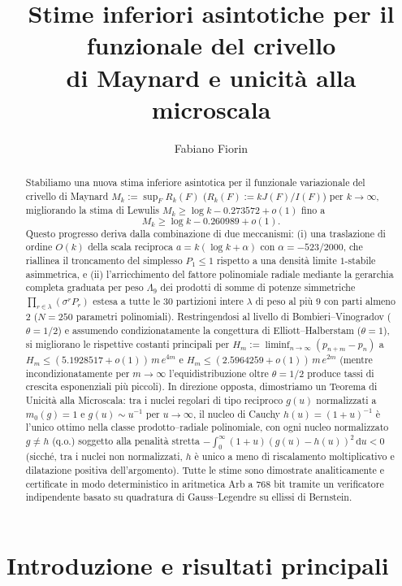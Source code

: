 \documentclass[11pt, reqno]{amsart}
\title[Stime asintotiche sul funzionale di Maynard]{%
Stime inferiori asintotiche per il funzionale del crivello\\
di Maynard e unicità alla microscala}
\author{Fabiano Fiorin}
\theoremstyle{remark}
\numberwithin{equation}{section}
\newcommand{\dd}{\,\mathrm{d}}
\begin{document}
\begin{abstract}
Stabiliamo una nuova stima inferiore asintotica per il funzionale variazionale del crivello
di Maynard $M_k := \sup_F R_k(F)$ ($R_k(F) := k J(F)/I(F)$) per $k \to \infty$, migliorando
la stima di Lewulis $M_k \ge \log k - 0.273572 + o(1)$ fino a
\[
M_k \ge \log k - 0.260989 + o(1).
\]
Questo progresso deriva dalla combinazione di due meccanismi: (i) una traslazione di ordine
$O(k)$ della scala reciproca $a = k(\log k + \alpha)$ con $\alpha = -523/2000$, che riallinea
il troncamento del simplesso $P_1 \le 1$ rispetto a una densità limite $1$-stabile asimmetrica,
e (ii) l'arricchimento del fattore polinomiale radiale mediante la gerarchia completa graduata per
peso $\Lambda_9$ dei prodotti di somme di potenze simmetriche $\prod_{r \in \lambda} (\sigma^r P_r)$
estesa a tutte le $30$ partizioni intere $\lambda$ di peso al più $9$ con parti almeno $2$
($N = 250$ parametri polinomiali). Restringendosi al livello di Bombieri--Vinogradov ($\theta = 1/2$)
e assumendo condizionatamente la congettura di Elliott--Halberstam ($\theta = 1$), si migliorano le
rispettive costanti principali per $H_m := \liminf_{n\to\infty}(p_{n+m}-p_n)$ a
$H_m \le (5.1928517 + o(1))\,m\,e^{4m}$ e $H_m \le (2.5964259 + o(1))\,m\,e^{2m}$
(mentre incondizionatamente per $m \to \infty$ l'equidistribuzione oltre $\theta = 1/2$ produce
tassi di crescita esponenziali più piccoli). In direzione opposta, dimostriamo un Teorema di Unicità
alla Microscala: tra i nuclei regolari di tipo reciproco $g(u)$ normalizzati a $m_0(g)=1$ e
$g(u) \sim u^{-1}$ per $u \to \infty$, il nucleo di Cauchy $h(u) = (1+u)^{-1}$ è l'unico
ottimo nella classe prodotto--radiale polinomiale, con ogni nucleo normalizzato $g \neq h$
(q.o.) soggetto alla penalità stretta $-\int_0^\infty (1+u)(g(u) - h(u))^2 \dd u < 0$ (sicché,
tra i nuclei non normalizzati, $h$ è unico a meno di riscalamento moltiplicativo e dilatazione
positiva dell'argomento). Tutte le stime
sono dimostrate analiticamente e certificate in modo deterministico in aritmetica Arb a $768$ bit
tramite un verificatore indipendente basato su quadratura di Gauss--Legendre su ellissi di Bernstein.
\end{abstract}

\maketitle

\section{Introduzione e risultati principali}
\end{document}
